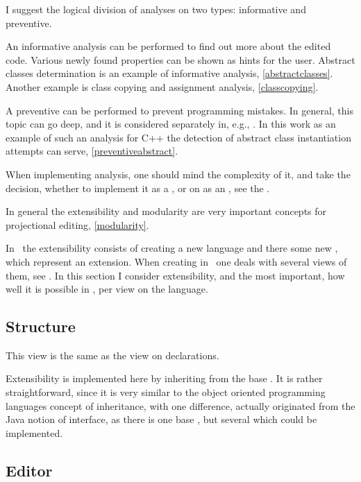 I suggest the logical division of analyses on two types: informative and preventive.

An informative analysis can be performed to find out more about the edited code. Various newly found properties
can be shown as hints for the user. Abstract classes determination is an example of informative analysis, \ref{abstractclasses}. Another example
is class copying and assignment analysis, \ref{classcopying}.

A preventive can be performed to prevent programming mistakes. In general, this topic can go deep, and it is considered separately in, e.g.,
\cite{2012_ratiu_modular_dsls_and_analyses}. In this work as an example of such an analysis for C++ the detection of abstract class instantiation
attempts can serve, \ref{preventiveabstract}.

When implementing analysis, one should mind the complexity of it, and take the decision, whether to implement it as a , or
on as an , see the .



In general the extensibility and modularity are very important concepts for projectional editing, \ref{modularity}.

In \jbmps\ the extensibility consists of creating a new language and there some new , which represent an extension.
When creating  in \jbmps\ one deals with several views of them, see . In this section I consider extensibility, and 
the most important, how well it is possible in \jbmps, per view on the language.

\subsection{Structure}

This view is the same as the view on  declarations.

Extensibility is implemented here by inheriting from the base . It is rather straightforward, 
since it is very similar to the object oriented programming languages concept of inheritance, with one difference, 
actually originated from the Java notion of interface, as there is one base , but several 
which could be implemented.

\subsection{Editor} 

